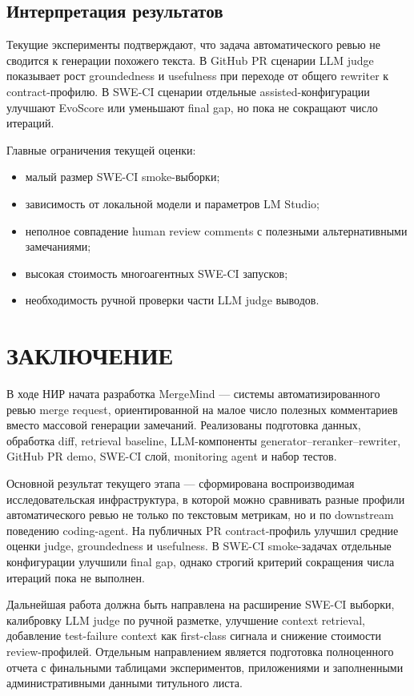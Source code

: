 \documentclass[14pt,a4paper]{extreport}
\begin{document}
\section{Интерпретация результатов}

Текущие эксперименты подтверждают, что задача автоматического ревью не сводится
к генерации похожего текста. В GitHub PR сценарии LLM judge показывает рост
groundedness и usefulness при переходе от общего rewriter к contract-профилю. В
SWE-CI сценарии отдельные assisted-конфигурации улучшают EvoScore или уменьшают
final gap, но пока не сокращают число итераций.

Главные ограничения текущей оценки:

\begin{itemize}
  \item малый размер SWE-CI smoke-выборки;
  \item зависимость от локальной модели и параметров LM Studio;
  \item неполное совпадение human review comments с полезными альтернативными
    замечаниями;
  \item высокая стоимость многоагентных SWE-CI запусков;
  \item необходимость ручной проверки части LLM judge выводов.
\end{itemize}

\chapter{ЗАКЛЮЧЕНИЕ}

В ходе НИР начата разработка MergeMind --- системы автоматизированного ревью
merge request, ориентированной на малое число полезных комментариев вместо
массовой генерации замечаний. Реализованы подготовка данных, обработка diff,
retrieval baseline, LLM-компоненты generator--reranker--rewriter, GitHub PR demo,
SWE-CI слой, monitoring agent и набор тестов.

Основной результат текущего этапа --- сформирована воспроизводимая
исследовательская инфраструктура, в которой можно сравнивать разные профили
автоматического ревью не только по текстовым метрикам, но и по downstream
поведению coding-agent. На публичных PR contract-профиль улучшил средние
оценки judge, groundedness и usefulness. В SWE-CI smoke-задачах отдельные
конфигурации улучшили final gap, однако строгий критерий сокращения числа
итераций пока не выполнен.

Дальнейшая работа должна быть направлена на расширение SWE-CI выборки,
калибровку LLM judge по ручной разметке, улучшение context retrieval,
добавление test-failure context как first-class сигнала и снижение стоимости
review-профилей. Отдельным направлением является подготовка полноценного отчета
с финальными таблицами экспериментов, приложениями и заполненными
административными данными титульного листа.
\end{document}
